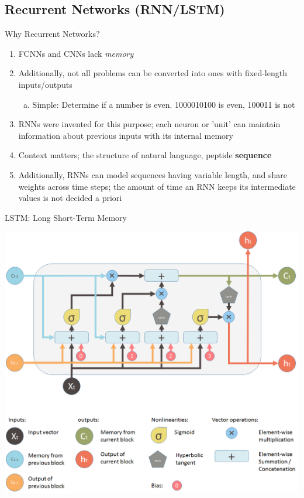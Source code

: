 \documentclass{beamer}
\begin{document}
\subsection{Recurrent Networks (RNN/LSTM)}
\begin{frame}{Why Recurrent Networks?}
    \begin{enumerate}[1.]
        \item FCNNs and CNNs lack \textit{memory}
        \item Additionally, not all problems can be converted into ones with fixed-length inputs/outputs
        \begin{enumerate}[a.]
            \item Simple: Determine if a number is even. 1000010100 is even, 100011 is not
        \end{enumerate}
        \item RNNs were invented for this purpose; each neuron or 'unit' can maintain information about previous inputs with its internal memory
        \item Context matters; the structure of natural language, peptide \textbf{sequence}
        \item Additionally, RNNs can model sequences having variable length, and share weights across time steps; the amount of time an RNN keeps its intermediate values is not decided a priori
    \end{enumerate}
\end{frame}
\begin{frame}{LSTM: Long Short-Term Memory}
\begin{center}
    \includegraphics[height=0.75\textheight]{nets/lstm.png}
\end{center}
\end{frame}
\end{document}
